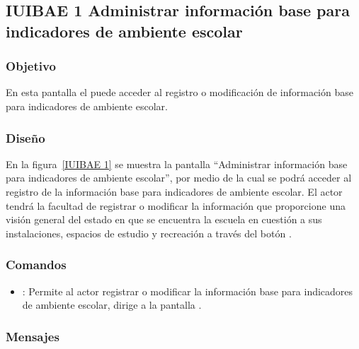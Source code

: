 \subsection{IUIBAE 1 Administrar información base para indicadores de ambiente escolar}

\subsubsection{Objetivo}
	
    En esta pantalla el  puede acceder al registro o modificación de información base para indicadores de ambiente escolar.

\subsubsection{Diseño}

    En la figura~\ref{IUIBAE 1} se muestra la pantalla ``Administrar información base para indicadores de ambiente escolar'', por medio de la cual se podrá acceder al registro de la información base para indicadores de ambiente escolar. El actor tendrá la facultad de registrar o modificar la información que proporcione una visión general del estado en que se encuentra la escuela en cuestión a sus instalaciones, espacios de estudio y recreación a través del botón \botEdit.  



\subsubsection{Comandos}
    \begin{itemize}
	\item {}: Permite al actor registrar o modificar la información base para indicadores de ambiente escolar, dirige a la pantalla . 
    \end{itemize}

\subsubsection{Mensajes}

